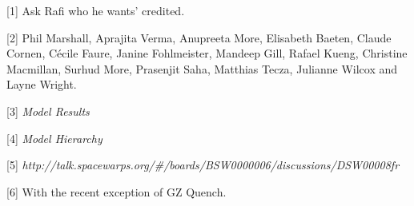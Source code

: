 \documentclass{article}
\begin{document}
{\small{}[1] Ask Rafi who he wants' credited.}

{\small{}[2] Phil Marshall, Aprajita Verma, Anupreeta More, Elisabeth Baeten, Claude 
Cornen, Cécile Faure, Janine Fohlmeister, Mandeep Gill, Rafael Kueng, Christine 
Macmillan, Surhud More, Prasenjit Saha, Matthias Tecza, Julianne Wilcox and Layne 
Wright.}

{\small{}[3] }{\small{}{\color{color02} \emph{Model Results}}}

{\small{}[4] }{\small{}{\color{color02} \emph{Model Hierarchy}}}

{\small{}[5] }{\small{}{\color{color02} \emph{http://talk.spacewarps.org/\#/boards/BSW0000006/discussions/DSW00008fr}}}

{\small{}[6] With the recent exception \label{HGoBack}of GZ Quench.}

\newpage
\end{document}
